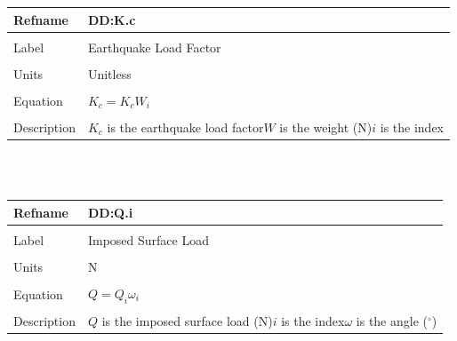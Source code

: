 \documentclass[12pt]{article}
\begin{document}
\noindent \begin{minipage}{\textwidth}
\begin{tabular}{p{} p{}}
\toprule \textbf{Refname} & \textbf{DD:K.c}
\label{DD:K.c}
\\ \midrule \\
Label & Earthquake Load Factor
\\ \midrule \\
Units & Unitless
\\ \midrule \\
Equation & ${K_{c}}={K_{c}} W_{i}$
\\ \midrule \\
Description & ${K_{c}}$ is the earthquake load factor\newline$W$ is the weight (N)\newline$i$ is the index
\\ \bottomrule \end{tabular}
\end{minipage}\\
~\newline
\noindent \begin{minipage}{\textwidth}
\begin{tabular}{p{} p{}}
\toprule \textbf{Refname} & \textbf{DD:Q.i}
\label{DD:Q.i}
\\ \midrule \\
Label & Imposed Surface Load
\\ \midrule \\
Units & N
\\ \midrule \\
Equation & $Q=Q_{i} \omega{}_{i}$
\\ \midrule \\
Description & $Q$ is the imposed surface load (N)\newline$i$ is the index\newline$\omega{}$ is the angle (${}^{\circ}$)
\\ \bottomrule \end{tabular}
\end{minipage}\\
~\newline
\end{document}
